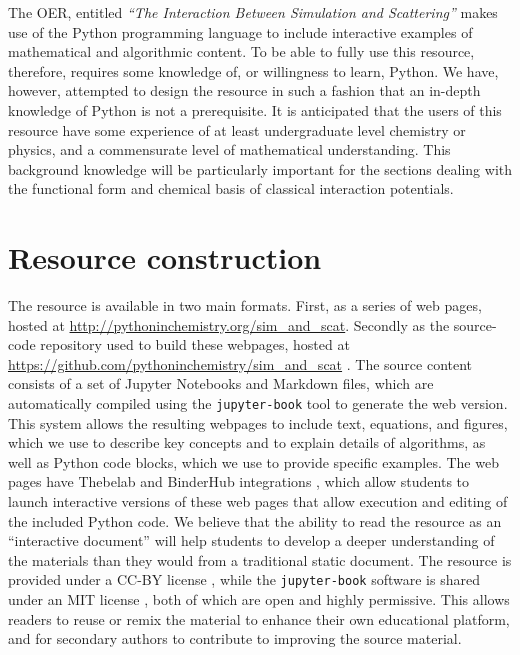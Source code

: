 \documentclass[amsmath,amssymb,twocolumn,superscriptaddress]{revtex4-1}
\begin{document}
The OER, entitled \emph{``The Interaction Between Simulation and Scattering''} makes use of the Python programming language to include interactive examples of mathematical and algorithmic content.
To be able to fully use this resource, therefore, requires some knowledge of, or willingness to learn, Python.
We have, however, attempted to design the resource in such a fashion that an in-depth knowledge of Python is not a prerequisite.
It is anticipated that the users of this resource have some experience of at least undergraduate level chemistry or physics, and a commensurate level of mathematical understanding.
This background knowledge will be particularly important for the sections dealing with the functional form and chemical basis of classical interaction potentials.

\section{Resource construction}

The resource is available in two main formats. First, as a series of web pages, hosted at \url{http://pythoninchemistry.org/sim_and_scat}.
Secondly as the source-code repository used to build these webpages, hosted at \url{https://github.com/pythoninchemistry/sim_and_scat} \cite{mccluskey_pythoninchemistry/sim_and_scat_2019}.
The source content consists of a set of Jupyter Notebooks and Markdown files, which are automatically compiled using the \texttt{jupyter-book} tool \cite{lau_jupyter/jupyter-book_2019} to generate the web version.
This system allows the resulting webpages to include text, equations, and figures, which we use to describe key concepts and to explain details of algorithms, as well as Python code blocks, which we use to provide specific examples. The web pages have Thebelab and BinderHub integrations \cite{ragan-kelley_minrk/thebelab_2019, ragan-kelley_jupyterhub/binderhub_2019, jupyter_binder_2018}, which allow students to launch interactive versions of these web pages that allow execution and editing of the included Python code.
We believe that the ability to read the resource as an ``interactive document'' will help students to develop a deeper understanding of the materials than they would from a traditional static document.
The resource is provided under a CC-BY license \cite{creative_commons_creative_2019}, while the \texttt{jupyter-book} software is shared under an MIT license \cite{open_source_mit_2019}, both of which are open and highly permissive.
This allows readers to reuse or remix the material to enhance their own educational platform, and for secondary authors to contribute to improving the source material.
\end{document}
